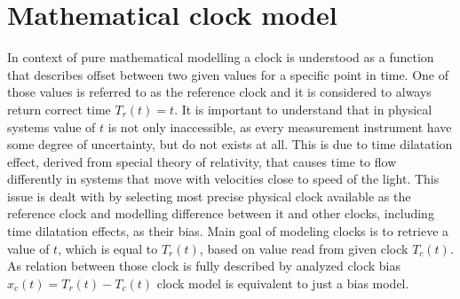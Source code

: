 \section{Mathematical clock model}
In context of pure mathematical modelling a clock is understood as a function that describes
offset between two given values for a specific point in time. One of those values is referred 
to as the reference clock and it is considered to always return correct time $T_{r}(t)=t$.
It is important to understand that in physical systems value of $t$ is not only inaccessible, as
every measurement instrument have some degree of uncertainty, but do not exists at all.
This is due to time dilatation effect, derived from special theory of relativity, that causes
time to flow differently in systems that move with velocities close to speed of the light.
This issue is dealt with by selecting most precise physical clock available as the reference
clock and modelling difference between it and other clocks, including time dilatation effects,
as their bias.
Main goal of modeling clocks is to retrieve a value of $t$, which is equal to $T_{r}(t)$, based
on value read from given clock $T_{c}(t)$. 
As relation between those clock is fully described by analyzed clock bias 
$x_{c}(t)=T_{r}(t)-T_{c}(t)$ clock model is equivalent to just a bias model.

